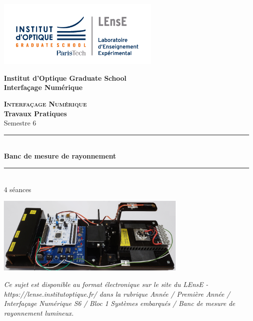 \documentclass[a4paper,11pt,titlepage]{article} %
\begin{document}
\begin{titlepage}

\begin{center}
	\begin{minipage}{2.5cm}
	\begin{center}
		\includegraphics[width=8cm]{images/Logo-LEnsE.png}
	\end{center}
\end{minipage}\hfill
\begin{minipage}{10cm}
	\begin{center}
	\textbf{Institut d'Optique Graduate School }\\[0.1cm]
    \textbf{Interfaçage Numérique}


	\end{center}
\end{minipage}\hfill


\vspace{4cm}


{\huge \bfseries \textsc{Interfaçage Numérique}} \\[0.5cm]
{\large \bfseries Travaux Pratiques} \\[0.2cm]
Semestre 6

\vspace{2cm}
\rule{\linewidth}{0.3mm} \\[0.4cm]
{ \huge \bfseries\color{violet_iogs} Banc de mesure de rayonnement \\[0.4cm] }
\rule{\linewidth}{0.3mm} \\[1cm]

4 séances

\bigskip

\begin{center}
	\includegraphics[width=0.7\textwidth]{images/rayonnement.png}
\end{center}

\vfill

\textit{Ce sujet est disponible au format électronique sur le site du LEnsE - https://lense.institutoptique.fr/ dans la rubrique Année / Première Année / Interfaçage Numérique S6 / Bloc 1 Systèmes embarqués / Banc de mesure de rayonnement lumineux.}


\end{center}
\end{titlepage}
\end{document}
